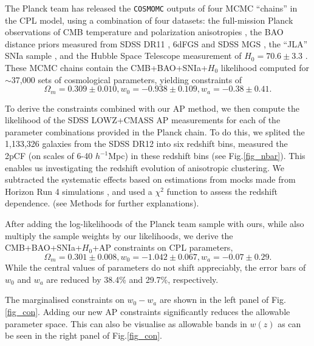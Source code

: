 \documentclass{natureprintstyle}
\let\citep\cite
\begin{document}
The Planck team has released the {\texttt {COSMOMC}} \citep{LB2002} outputs of four MCMC ``chains'' in the CPL model, 
using a combination of four datasets:
the full-mission Planck observations of CMB temperature and polarization anisotropies \cite{Planck2015},
the BAO distance priors measured from SDSS DR11 \citep{Anderson2013}, 6dFGS \citep{6dFGS} and SDSS MGS \citep{MGS},
the ``JLA'' SNIa sample \citep{JLA},
and the Hubble Space Telescope measurement of $H_0=70.6\pm3.3$ \cite{Riess2011,E14H0}.
These MCMC chains contain the CMB+BAO+SNIa+$H_0$ likelihood computed for $\sim$37,000 sets of cosmological parameters,
yielding constraints of %
\begin{equation}
 \Omega_m = 0.309 \pm 0.010, w_0 = -0.938 \pm 0.109, w_a = -0.38 \pm 0.41.
\end{equation}

To derive the constraints combined with our AP method,
we then compute the likelihood of the SDSS LOWZ+CMASS AP measurements for each of the parameter combinations provided in the Planck chain. 
To do this, we splited the 1,133,326 galaxies from the SDSS DR12 into six redshift bins,
measured the 2pCF (on scales of 6-40 $h^{-1}$Mpc) in these redshift bins (see Fig.\ref{fig_nbar}).
This enables us investigating the redshift evolution of anisotropic clustering.
We subtracted the systematic effects based on estimations from mocks made from Horizon Run 4 simulations \citep{HR4},
and used a $\chi^2$ function to assess the redshift dependence.
(see Methods for further explanations).

After adding the log-likelihoods of the Planck team sample with ours, 
while also multiply the sample weights by our likelihoods, 
we derive the CMB+BAO+SNIa+$H_0$+AP constraints on CPL parameters, %
\begin{equation}
\Omega_m = 0.301 \pm 0.008, w_0 = -1.042 \pm 0.067, w_a = -0.07 \pm 0.29.
\end{equation}
While the central values of parameters do not shift appreciably,
the error bars of $w_0$ and $w_a$ are reduced by 38.4\% and 29.7\%, respectively.%

The marginalised constraints on $w_0-w_a$ are shown in the left panel of Fig.\ref{fig_con}.
Adding our new AP constraints significantly reduces the allowable parameter space. 
This can also be visualise as allowable bands in $w(z)$ as can be seen in the right panel of Fig.\ref{fig_con}.  
\end{document}

